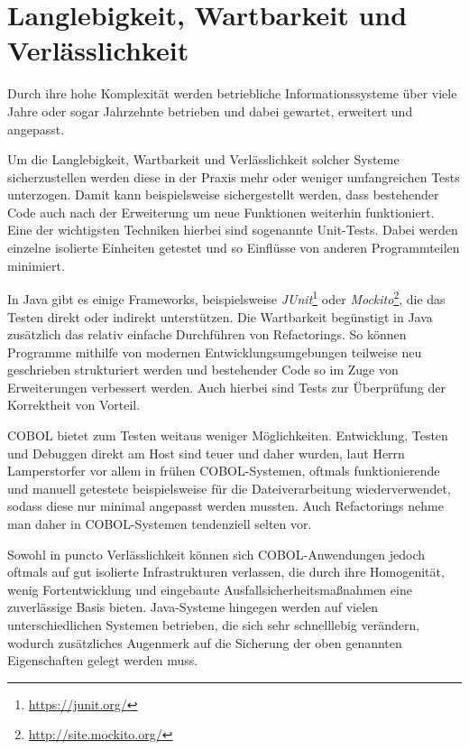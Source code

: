 \section{Langlebigkeit, Wartbarkeit und Verlässlichkeit}

Durch ihre hohe Komplexität werden betriebliche Informationssysteme \idR über viele Jahre oder sogar Jahrzehnte betrieben und dabei gewartet,  erweitert und angepasst. 

Um die Langlebigkeit, Wartbarkeit und Verlässlichkeit solcher Systeme sicherzustellen werden diese in der Praxis mehr oder weniger umfangreichen Tests unterzogen. Damit kann beispielsweise sichergestellt werden, dass bestehender Code auch nach der Erweiterung um neue Funktionen weiterhin funktioniert. Eine der wichtigsten Techniken hierbei sind sogenannte Unit-Tests. Dabei werden einzelne isolierte Einheiten getestet und so Einflüsse von anderen Programmteilen minimiert. 

In Java gibt es einige Frameworks, beispielsweise \textit{JUnit}\footnote{\url{https://junit.org/}} oder \textit{Mockito}\footnote{\url{http://site.mockito.org/}}, die das Testen direkt oder indirekt unterstützen. Die Wartbarkeit begünstigt in Java zusätzlich das relativ einfache Durchführen von Refactorings. So können Programme mithilfe von modernen Entwicklungsumgebungen teilweise neu geschrieben \bzw strukturiert werden und bestehender Code so im Zuge von Erweiterungen verbessert werden. Auch hierbei sind Tests zur Überprüfung der Korrektheit von Vorteil. 

COBOL bietet zum Testen weitaus weniger Möglichkeiten. Entwicklung, Testen und Debuggen direkt am Host sind teuer und daher wurden, laut Herrn Lamperstorfer vor allem in frühen COBOL-Systemen, oftmals funktionierende und manuell getestete  beispielsweise für die Dateiverarbeitung wiederverwendet, sodass diese nur minimal angepasst werden mussten. Auch Refactorings nehme man daher in COBOL-Systemen tendenziell selten vor.

Sowohl in puncto Verlässlichkeit können sich COBOL-Anwendungen jedoch oftmals auf gut isolierte Infrastrukturen verlassen, die durch ihre Homogenität, wenig Fortentwicklung und eingebaute Ausfallsicherheitsmaßnahmen eine zuverlässige Basis bieten. Java-Systeme hingegen werden auf vielen unterschiedlichen Systemen betrieben, die sich sehr schnelllebig verändern, wodurch zusätzliches Augenmerk auf die Sicherung der oben genannten Eigenschaften gelegt werden muss.